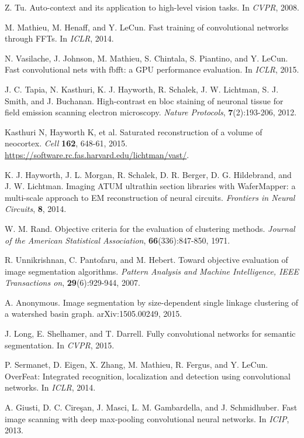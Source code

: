 \documentclass{article} %
\begin{document}
\begin{thebibliography}{9}
{
Z. Tu. Auto-context and its application to high-level vision tasks. In {\it CVPR}, 2008.


M. Mathieu, M. Henaff, and Y. LeCun. Fast training of convolutional networks through FFTs. In {\it ICLR}, 2014.

N. Vasilache, J. Johnson, M. Mathieu, S. Chintala, S. Piantino, and Y. LeCun. Fast convolutional nets with fbfft: a GPU performance evaluation. In {\it ICLR}, 2015.

J. C. Tapia, N. Kasthuri, K. J. Hayworth, R. Schalek, J. W. Lichtman, S. J. Smith, and J. Buchanan. High-contrast en bloc staining of neuronal tissue for field emission scanning electron microscopy. {\it Nature Protocols}, {\bf 7}(2):193-206, 2012.

Kasthuri N, Hayworth K, et al. Saturated
reconstruction of a volume of neocortex. {\em Cell} {\bf 162}, 648-61, 2015.
\url{https://software.rc.fas.harvard.edu/lichtman/vast/}.

K. J. Hayworth, J. L. Morgan, R. Schalek, D. R. Berger, D. G. Hildebrand, and J. W. Lichtman. Imaging ATUM ultrathin section libraries with WaferMapper: a multi-scale approach to EM reconstruction of neural circuits. {\it Frontiers in Neural Circuits}, {\bf 8}, 2014.

W. M. Rand. Objective criteria for the evaluation of clustering methods. {\it Journal of the American Statistical Association}, {\bf 66}(336):847-850, 1971.

R. Unnikrishnan, C. Pantofaru, and M. Hebert. Toward objective evaluation of image segmentation algorithms. {\it Pattern Analysis and Machine Intelligence, IEEE Transactions on}, {\bf 29}(6):929-944, 2007.

A. Anonymous. Image segmentation by size-dependent single linkage clustering of a watershed basin graph. arXiv:1505.00249, 2015.

J. Long, E. Shelhamer, and T. Darrell. Fully convolutional networks for semantic segmentation. In {\it CVPR}, 2015.

P. Sermanet, D. Eigen, X. Zhang, M. Mathieu, R. Fergus, and Y. LeCun. OverFeat: Integrated recognition, localization and detection using convolutional networks. In {\it ICLR}, 2014.

A. Giusti, D. C. Cire\c{s}an, J. Masci, L. M. Gambardella, and J. Schmidhuber. Fast image scanning with deep
max-pooling convolutional neural networks. In {\it ICIP}, 2013.

}
\end{thebibliography}
\end{document}
